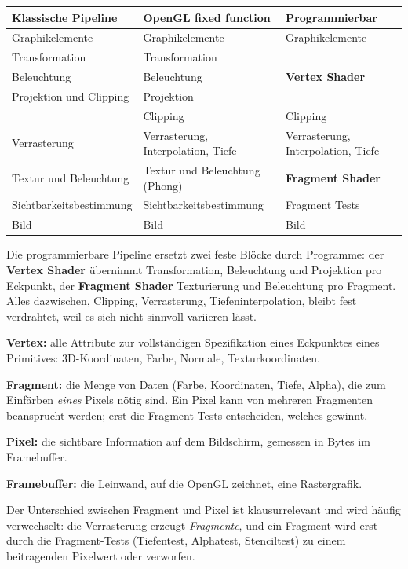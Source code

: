 \documentclass[12pt, a4paper]{article}
\begin{document}
\begin{center}
\begin{tabular}{@{}p{4.2cm}p{4.2cm}p{4.2cm}@{}}
\toprule
\textbf{Klassische Pipeline} & \textbf{OpenGL fixed function} & \textbf{Programmierbar} \\
\midrule
Graphikelemente & Graphikelemente & Graphikelemente \\
Transformation & Transformation & \multirow{3}{*}{\textbf{Vertex Shader}} \\
Beleuchtung & Beleuchtung & \\
Projektion und Clipping & Projektion & \\
& Clipping & Clipping \\
Verrasterung & Verrasterung, Interpolation, Tiefe & Verrasterung, Interpolation, Tiefe \\
Textur und Beleuchtung & Textur und Beleuchtung (Phong) & \textbf{Fragment Shader} \\
Sichtbarkeitsbestimmung & Sichtbarkeitsbestimmung & Fragment Tests \\
Bild & Bild & Bild \\
\bottomrule
\end{tabular}
\end{center}

Die programmierbare Pipeline ersetzt zwei feste Blöcke durch Programme: der
\textbf{Vertex Shader} übernimmt Transformation, Beleuchtung und Projektion pro
Eckpunkt, der \textbf{Fragment Shader} Texturierung und Beleuchtung pro Fragment.
Alles dazwischen, Clipping, Verrasterung, Tiefeninterpolation, bleibt fest verdrahtet,
weil es sich nicht sinnvoll variieren lässt.

\begin{definitionbox}
\textbf{Vertex:} alle Attribute zur vollständigen Spezifikation eines Eckpunktes eines
Primitives: 3D-Koordinaten, Farbe, Normale, Texturkoordinaten.

\textbf{Fragment:} die Menge von Daten (Farbe, Koordinaten, Tiefe, Alpha), die zum
Einfärben \textit{eines} Pixels nötig sind. Ein Pixel kann von mehreren Fragmenten
beansprucht werden; erst die Fragment-Tests entscheiden, welches gewinnt.

\textbf{Pixel:} die sichtbare Information auf dem Bildschirm, gemessen in Bytes im
Framebuffer.

\textbf{Framebuffer:} die Leinwand, auf die OpenGL zeichnet, eine Rastergrafik.
\end{definitionbox}

\begin{notebox}
Der Unterschied zwischen Fragment und Pixel ist klausurrelevant und wird häufig
verwechselt: die Verrasterung erzeugt \textit{Fragmente}, und ein Fragment wird erst
durch die Fragment-Tests (Tiefentest, Alphatest, Stenciltest) zu einem beitragenden
Pixelwert oder verworfen.
\end{notebox}
\end{document}
